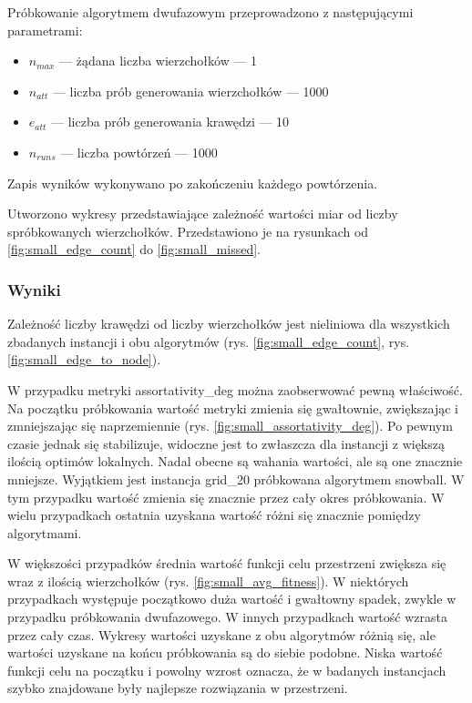 Próbkowanie algorytmem dwufazowym przeprowadzono z następującymi parametrami:
\begin{itemize}
    \item $n_{max}$ --- żądana liczba wierzchołków --- 1
    \item $n_{att}$ --- liczba prób generowania wierzchołków --- 1000
    \item $e_{att}$ --- liczba prób generowania krawędzi --- 10
    \item $n_{runs}$ --- liczba powtórzeń --- 1000
\end{itemize}
Zapis wyników wykonywano po zakończeniu każdego powtórzenia.

Utworzono wykresy przedstawiające zależność wartości miar od liczby spróbkowanych wierzchołków.
Przedstawiono je na rysunkach od \ref{fig:small_edge_count} do \ref{fig:small_missed}.

\subsubsection{Wyniki}

Zależność liczby krawędzi od liczby wierzchołków jest nieliniowa dla wszystkich zbadanych instancji i obu algorytmów (rys. \ref{fig:small_edge_count}, rys. \ref{fig:small_edge_to_node}).

W przypadku metryki assortativity\_deg można zaobserwować pewną właściwość.
Na początku próbkowania wartość metryki zmienia się gwałtownie, zwiększając i zmniejszając się naprzemiennie (rys. \ref{fig:small_assortativity_deg}).
Po pewnym czasie jednak się stabilizuje, widoczne jest to zwłaszcza dla instancji z większą ilością optimów lokalnych.
Nadal obecne są wahania wartości, ale są one znacznie mniejsze.
Wyjątkiem jest instancja grid\_20 próbkowana algorytmem snowball.
W tym przypadku wartość zmienia się znacznie przez cały okres próbkowania.
W wielu przypadkach ostatnia uzyskana wartość różni się znacznie pomiędzy algorytmami.

W większości przypadków średnia wartość funkcji celu przestrzeni zwiększa się wraz z ilością wierzchołków (rys. \ref{fig:small_avg_fitness}).
W niektórych przypadkach występuje początkowo duża wartość i gwałtowny spadek, zwykle w przypadku próbkowania dwufazowego.
W innych przypadkach wartość wzrasta przez cały czas.
Wykresy wartości uzyskane z obu algorytmów różnią się, ale wartości uzyskane na końcu próbkowania są do siebie podobne.
Niska wartość funkcji celu na początku i powolny wzrost oznacza, że w badanych instancjach szybko znajdowane były
najlepsze rozwiązania w przestrzeni.

